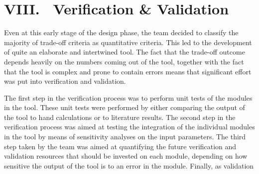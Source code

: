 
\section*{VIII. \ Verification \& Validation }
\label{ES.VandV}

Even at this early stage of the design phase, the team decided to classify the majority of trade-off criteria as quantitative criteria. This led to the development of quite an elaborate and intertwined tool. The fact that the trade-off outcome depends heavily on the numbers coming out of the tool, together with the fact that the tool is complex and prone to contain errors means that significant effort was put into verification and validation.

The first step in the verification process was to perform unit tests of the modules in the tool. These unit tests were performed by either comparing the output of the tool to hand calculations or to literature results. The second step in the verification process was aimed at testing the integration of the individual modules in the tool by means of sensitivity analyses on the input parameters. The third step taken by the team was aimed at quantifying the future verification and validation resources that should be invested on each module, depending on how sensitive the output of the tool is to an error in the module. Finally, as validation 